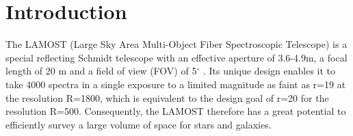 \documentclass[referee]{raa}            %
\begin{document}
   \maketitle

%
%


\section{Introduction}           %
\label{sect:intro}
The LAMOST (Large Sky Area Multi-Object Fiber Spectroscopic Telescope) is a special reflecting Schmidt telescope with an effective aperture of 3.6-4.9m, a focal length of 20 m and a field of view (FOV) of 5$^\circ$ \citep{cui2012large}.
Its unique design enables it to take 4000 spectra in a single exposure to a limited magnitude as faint as r=19 at the resolution R=1800, which is equivalent to the design goal of r=20 for the resolution R=500.
Consequently, the LAMOST  therefore has a great potential to efficiently survey a large volume of space for stars and galaxies.
\end{document}
